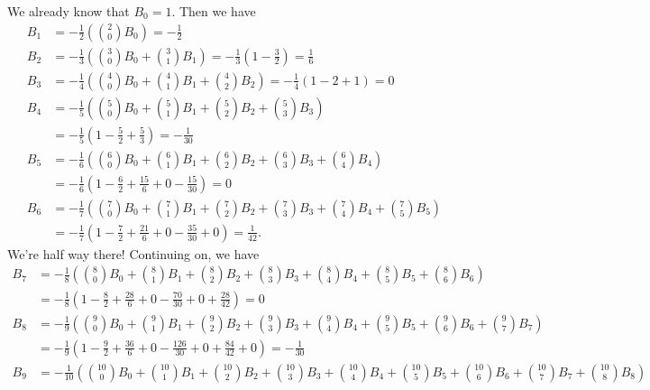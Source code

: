 \documentclass[10pt]{amsart}
\theoremstyle{nonumberplain}
\begin{document}
\begin{enumerate}[label={\bf {\arabic*}:}]
\begin{enumerate}
We already know that $B_0 = 1$.
Then we have
\begin{align*}
B_1 &= - \frac 1 2 \left( {2 \choose 0}B_0 \right) = - \frac 1 2 \\
B_2 &= - \frac 1 3 \left( {3 \choose 0}B_0 +  {3 \choose 1}B_1 \right)
	= - \frac 1 3 \left( 1 - \frac 3 2 \right)
	= \frac 1 6 \\
B_3 &= - \frac 1 4 \left( {4 \choose 0}B_0 +  {4 \choose 1}B_1 + {4 \choose 2}B_2 \right)
	= - \frac 1 4 \left( 1 - 2 + 1 \right)
	= 0 \\
B_4 &= - \frac 1 5 \left( {5 \choose 0}B_0 +  {5 \choose 1}B_1 + {5 \choose 2}B_2 + {5 \choose 3}B_3 \right) \\
	&= - \frac 1 5 \left( 1 - \frac 5 2 + \frac 5 3 \right)
	= - \frac 1 {30} \\
B_5 &= - \frac 1 6 \left( {6 \choose 0}B_0 +  {6 \choose 1}B_1 + {6 \choose 2}B_2 + {6 \choose 3}B_3 + {6 \choose 4}B_4 \right) \\
	&= - \frac 1 6 \left( 1 - \frac 6 2 + \frac {15} 6 + 0 - \frac {15}{30} \right)
	= 0 \\
B_6 &= - \frac 1 7 \left( {7 \choose 0}B_0 +  {7 \choose 1}B_1 + {7 \choose 2}B_2 + {7 \choose 3}B_3 + {7 \choose 4}B_4 + {7 \choose 5}B_5 \right) \\
	&= - \frac 1 7 \left( 1 - \frac 7 2 + \frac {21} 6 + 0 - \frac {35}{30} + 0 \right)
	= \frac 1 {42}.
\end{align*}
We're half way there!
Continuing on, we have
\begin{align*}
B_7 &= - \frac 1 8 \left(
		{8 \choose 0}B_0
		+  {8 \choose 1}B_1
		+ {8 \choose 2}B_2
		+ {8 \choose 3}B_3
		+ {8 \choose 4}B_4
		+ {8 \choose 5}B_5
		+ {8 \choose 6}B_6
	\right) \\
	&= - \frac 1 8 \left( 1 - \frac 8 2 + \frac {28} 6 + 0 - \frac {70}{30} + 0 + \frac {28} {42} \right)
	= 0 \\
B_8 &= - \frac 1 9 \left(
		{9 \choose 0}B_0
		+  {9 \choose 1}B_1
		+ {9 \choose 2}B_2
		+ {9 \choose 3}B_3
		+ {9 \choose 4}B_4
		+ {9 \choose 5}B_5
		+ {9 \choose 6}B_6
		+ {9 \choose 7}B_7
	\right) \\
	&= - \frac 1 9 \left( 1 - \frac 9 2 + \frac {36} 6 + 0 - \frac {126} {30} + 0 + \frac {84}{42} + 0\right)
	= - \frac 1 {30} \\
B_9 &= - \frac 1 {10} \left(
		{10 \choose 0}B_0
		+  {10 \choose 1}B_1
		+ {10 \choose 2}B_2
		+ {10 \choose 3}B_3
		+ {10 \choose 4}B_4
		+ {10 \choose 5}B_5
		+ {10 \choose 6}B_6
		+ {10 \choose 7}B_7
		+ {10 \choose 8}B_8
	\right) \\

\end{align*}
\end{enumerate}
\end{enumerate}
\end{document}
